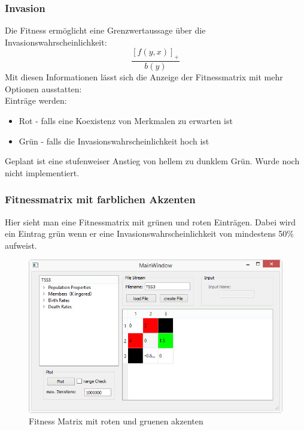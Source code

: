 \documentclass{beamer}
\begin{document}
		\begin{frame}
			\frametitle{Invasion}
			\pause
			Die Fitness ermöglicht eine Grenzwertaussage über die Invasionswahrscheinlichkeit:
			\[ \frac{\left[ f(y,x)\right]_+ }{b(y)} \]
			\pause
			Mit diesen Informationen lässt sich die Anzeige der Fitnessmatrix mit mehr Optionen ausstatten:\\
			\pause
			Einträge werden:
			\begin{itemize}
				\item Rot - falls eine Koexistenz von Merkmalen zu erwarten ist 
				\item Grün - falls die Invasionswahrscheinlichkeit hoch ist
			\end{itemize}
			Geplant ist eine stufenweiser Anstieg von hellem zu dunklem Grün. Wurde noch nicht implementiert.
		\end{frame}	
		\begin{frame}
			\frametitle{Fitnessmatrix mit farblichen Akzenten}
			Hier sieht man eine Fitnessmatrix mit grünen und roten Einträgen. Dabei wird ein Eintrag grün wenn er eine Invasionswahrscheinlichkeit von mindestens 50\% aufweist.
			\begin{figure}[H]
				\centering
				\includegraphics[width=0.7\linewidth]{./MainWindow_red_green_loaded}
				\caption[MainWindow_redGreenFitness]{Fitness Matrix mit roten und gruenen akzenten}
				\label{fig:MainWindow_red_green_loaded}
			\end{figure}
		\end{frame}	
		
\end{document}
